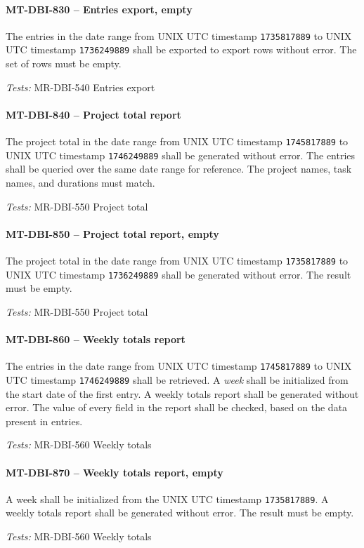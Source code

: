 \paragraph{MT-DBI-830 -- Entries export, empty}
The entries in the date range from UNIX UTC timestamp
\lstinline{1735817889} to UNIX UTC timestamp \lstinline{1736249889}
shall be exported to export rows without error. The set of rows must be empty.

\textit{Tests: } MR-DBI-540 Entries export

\paragraph{MT-DBI-840 -- Project total report}
The project total in the date range from UNIX UTC timestamp
\lstinline{1745817889} to UNIX UTC timestamp \lstinline{1746249889} shall be
generated without error.
The entries shall be queried over the same date range for reference.
The project names, task names, and durations must match.

\textit{Tests: } MR-DBI-550 Project total

\paragraph{MT-DBI-850 -- Project total report, empty}
The project total in the date range from UNIX UTC timestamp
\lstinline{1735817889} to UNIX UTC timestamp \lstinline{1736249889}
shall be generated without error. The result must be empty.

\textit{Tests: } MR-DBI-550 Project total

\paragraph{MT-DBI-860 -- Weekly totals report}
The entries in the date range from UNIX UTC timestamp \lstinline{1745817889} to
UNIX UTC timestamp \lstinline{1746249889} shall be retrieved.
A \emph{week} shall be initialized from the start date of the first entry.
A weekly totals report shall be generated without error.
The value of every field in the report shall be checked, based on the data
present in entries.

\textit{Tests: } MR-DBI-560 Weekly totals

\paragraph{MT-DBI-870 -- Weekly totals report, empty}
A week shall be initialized from the UNIX UTC timestamp
\lstinline{1735817889}. A weekly totals report shall be generated without error.
The result must be empty.

\textit{Tests: } MR-DBI-560 Weekly totals
